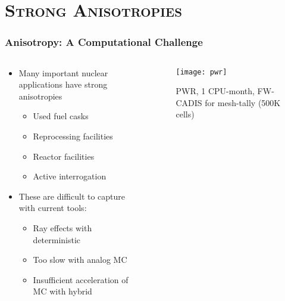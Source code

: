 \documentclass[xcolor=x11names,compress]{beamer}
\renewcommand{\(}{\begin{columns}}
\renewcommand{\)}{\end{columns}}
\newcommand{\<}[1]{\begin{column}{#1}}
\renewcommand{\>}{\end{column}}
\begin{document}
\section{\scshape Strong Anisotropies}
\begin{frame}[fragile]
  \frametitle{Anisotropy: A Computational Challenge}

	\begin{columns}
  	\begin{column}{0.5\textwidth}
	\begin{itemize}
	\item Many important nuclear applications have strong anisotropies
	 \begin{itemize}
	 \item Used fuel casks
	 \item Reprocessing facilities
	 \item Reactor facilities
	 \item Active interrogation 
	 \end{itemize}
	\item These are difficult to capture with current tools:
	 \begin{itemize}
	 \item Ray effects with deterministic
	 \item Too slow with analog MC
	 \item Insufficient acceleration of MC with hybrid
	 \end{itemize}
	\end{itemize}
  	\end{column}
 	\begin{column}{0.5\textwidth}
 	 \begin{center}
 	 \begin{figure}
 	 \texttt{[image: pwr]}  
 	 \caption{PWR, 1 CPU-month, FW-CADIS  for mesh-tally (500K cells)}
 	 \end{figure}
 	 \end{center}

  	\end{column}
	\end{columns}

\end{frame}
\end{document}
